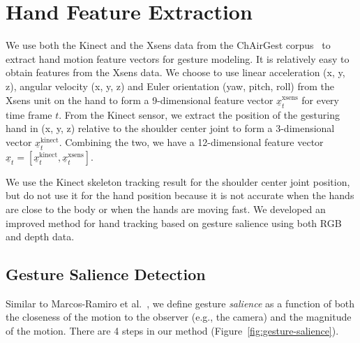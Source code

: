 \documentclass{sig-alternate-2013}
\begin{document}
\section{Hand Feature Extraction}
We use both the Kinect and the Xsens data from the ChAirGest corpus~\cite{Ruffieux2013} to
extract hand motion feature vectors for gesture modeling.
It is relatively easy to obtain features from the Xsens data. We choose to use linear
acceleration (x, y, z), angular velocity (x, y, z) and Euler orientation (yaw, pitch, roll)
from the Xsens unit on the hand to form a 9-dimensional feature vector $\underline{x}_t^{\text{xsens}}$
for every time frame $t$.
From the Kinect sensor, we extract the position of the gesturing hand in (x, y, z) relative to
the shoulder center joint to
form a 3-dimensional vector $\underline{x}_t^{\text{kinect}}$. Combining the two, we
have a 12-dimensional feature vector $\underline{x}_t = [\underline{x}^\text{kinect}_t, \underline{x}^\text{xsens}_t]$.

We use the Kinect skeleton tracking result for the shoulder center joint position,
but do not use it for the hand position because
it is not accurate when the hands are close to the body or when the hands are moving fast.
We developed an improved method for hand tracking based on gesture salience using both
RGB and depth data.

\subsection{Gesture Salience Detection}
Similar to Marcos-Ramiro et al.~\cite{marcos2013}, we define gesture
\textit{salience} as a function of both the closeness of the motion to the
observer (e.g., the camera) and the magnitude of the motion.
There are 4 steps in our method (Figure~\ref{fig:gesture-salience}). 
\end{document}
